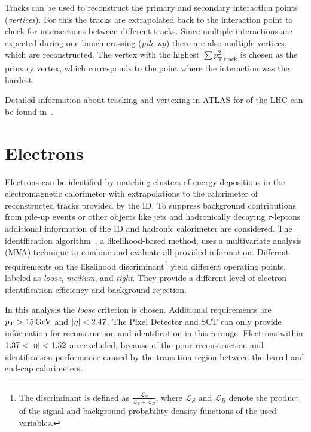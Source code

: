 Tracks can be used to reconstruct the primary and secondary interaction points (\emph{vertices}).
For this the tracks are extrapolated back to the interaction point to check for intersections between different tracks.
Since multiple interactions are expected during one bunch crossing (\emph{pile-up}) there are also multiple vertices, which
are reconstructed.
The vertex with the highest $\sum p_{\text{T},\text{track}}^2$ is chosen as the primary vertex, which corresponds to the
point where the interaction was the hardest.

Detailed information about tracking and vertexing in ATLAS for \runtwo{} of the LHC
can be found in~\cite{ATL-PHYS-PUB-2015-051,ATL-PHYS-PUB-2015-006,ATL-PHYS-PUB-2015-026}.


\section{Electrons}\label{sec:object_selection:electrons}

Electrons can be identified by matching clusters of energy depositions in the electromagnetic calorimeter with
extrapolations to the calorimeter of reconstructed tracks provided by the ID\@.
To suppress background contributions from pile-up events or other objects like jets and hadronically decaying $\tau$-leptons
additional information of the ID and hadronic calorimeter are considered.
The identification algorithm~\cite{ATLAS-CONF-2016-024}, a likelihood-based method, uses a multivariate analysis (MVA) technique to
combine and evaluate all provided information.
Different requirements on the likelihood discriminant\footnote{The discriminant is defined as
$\frac{\mathcal{L}_S}{\mathcal{L}_S + \mathcal{L}_B}$, where $\mathcal{L}_S$ and $\mathcal{L}_B$ denote the product of
the signal and background probability density functions of the used variables.} yield different operating points,
labeled as  \emph{loose}, \emph{medium}, and \emph{tight}.
They provide a different level of electron identification efficiency and background rejection.

In this analysis the \emph{loose} criterion is chosen.
Additional requirements are $\pt > \SI{15}{\GeV}$ and $\left|\eta\right| < 2.47$.
The Pixel Detector and SCT can only provide information for reconstruction and identification in this $\eta$-range.
Electrons within $1.37 < \left|\eta\right| < 1.52$ are excluded, because of the poor reconstruction and identification
performance caused by the transition region between the barrel and end-cap calorimeters.

